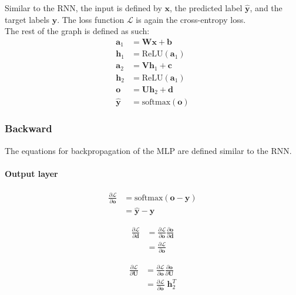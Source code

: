 \documentclass{article}
\numberwithin{equation}{section}
\begin{document}
Similar to the RNN, the input is defined by $\bm{x}$, the predicted label $\hat{\bm{y}}$, and the target labels $\bm{y}$. The loss function $\mathcal{L}$ is again the cross-entropy loss.\\

The rest of the graph is defined as such:
\begin{equation}
\begin{split}
	\bm{a}_1 &= \bm{W}\bm{x} + \bm{b} \\
	\bm{h}_1 &= \text{ReLU}(\bm{a}_1) \\
	\bm{a}_2 &= \bm{V}\bm{h}_1 + \bm{c} \\
	\bm{h}_2 &= \text{ReLU}(\bm{a}_1) \\
	\bm{o} &= \bm{U}\bm{h}_2 + \bm{d} \\
	\hat{\bm{y}} &= \text{softmax}(\bm{o})
\end{split}
\end{equation}

\subsubsection{Backward}
The equations for backpropagation of the MLP are defined similar to the RNN.

\paragraph{Output layer}
\begin{equation}
\begin{split}
	\frac{\partial\mathcal{L}}{\partial\bm{o}}
		&= \text{softmax}(\bm{o} - \bm{y}) \\
		&= \hat{\bm{y}} - \bm{y}
\end{split}
\end{equation}

\begin{equation}
\begin{split}
	\frac{\partial\mathcal{L}}{\partial\bm{d}}
		&=	\frac{\partial\mathcal{L}}{\partial\bm{o}} \frac{\partial\bm{o}}{\partial\bm{d}} \\
		&= \frac{\partial\mathcal{L}}{\partial\bm{o}}
\end{split}
\end{equation}

\begin{equation}
\begin{split}
\frac{\partial\mathcal{L}}{\partial\bm{U}}
	&=	\frac{\partial\mathcal{L}}{\partial\bm{o}} \frac{\partial\bm{o}}{\partial\bm{U}} \\
	&= \frac{\partial\mathcal{L}}{\partial\bm{o}} \;\bm{h}_2^T
\end{split}
\end{equation}
\end{document}
